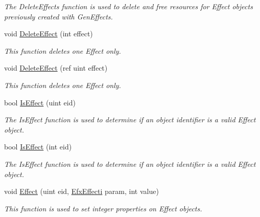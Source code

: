 \begin{DoxyCompactItemize}
\begin{DoxyCompactList}\small\item\em The Delete\-Effects function is used to delete and free resources for Effect objects previously created with Gen\-Effects.\end{DoxyCompactList}\item 
void \hyperlink{class_open_t_k_1_1_audio_1_1_open_a_l_1_1_effects_extension_a5e73e7637657e34ad587b5a4421406a1}{Delete\-Effect} (int effect)
\begin{DoxyCompactList}\small\item\em This function deletes one Effect only.\end{DoxyCompactList}\item 
void \hyperlink{class_open_t_k_1_1_audio_1_1_open_a_l_1_1_effects_extension_a2e9b431a6a8ee248f15b8d5f91819612}{Delete\-Effect} (ref uint effect)
\begin{DoxyCompactList}\small\item\em This function deletes one Effect only.\end{DoxyCompactList}\item 
bool \hyperlink{class_open_t_k_1_1_audio_1_1_open_a_l_1_1_effects_extension_ab54a3c1793c8e9ae1950f25fa3bb9091}{Is\-Effect} (uint eid)
\begin{DoxyCompactList}\small\item\em The Is\-Effect function is used to determine if an object identifier is a valid Effect object.\end{DoxyCompactList}\item 
bool \hyperlink{class_open_t_k_1_1_audio_1_1_open_a_l_1_1_effects_extension_a05a58048724fb4aef1583123c82e8bdc}{Is\-Effect} (int eid)
\begin{DoxyCompactList}\small\item\em The Is\-Effect function is used to determine if an object identifier is a valid Effect object.\end{DoxyCompactList}\item 
void \hyperlink{class_open_t_k_1_1_audio_1_1_open_a_l_1_1_effects_extension_a8e948592b6a210d3d1fa94c05bc40def}{Effect} (uint eid, \hyperlink{namespace_open_t_k_1_1_audio_1_1_open_a_l_a49039c1ddcb53675576ad2780fc50315}{Efx\-Effecti} param, int value)
\begin{DoxyCompactList}\small\item\em This function is used to set integer properties on Effect objects.\end{DoxyCompactList}\item 

\end{DoxyCompactItemize}
